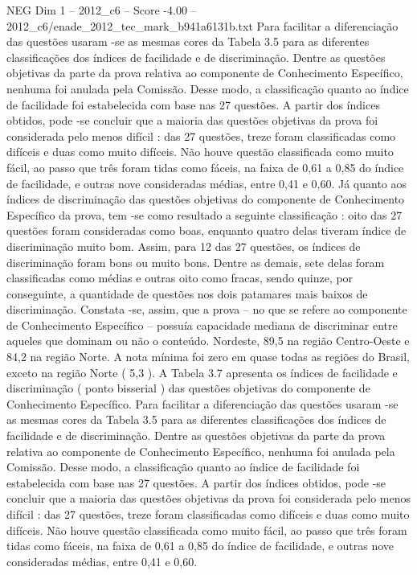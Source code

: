 \begin{textsample}{NEG Dim 1 – 2012\_c6 – Score -4.00 – 2012\_c6/enade\_2012\_tec\_mark\_b941a6131b.txt}
Para facilitar a diferenciação das questões usaram -se as mesmas cores da Tabela 3.5 para as diferentes classificações dos índices de facilidade e de discriminação.
Dentre as questões objetivas da parte da prova relativa ao componente de Conhecimento Específico, nenhuma foi anulada pela Comissão.
Desse modo, a classificação quanto ao índice de facilidade foi estabelecida com base nas 27 questões.
A partir dos índices obtidos, pode -se concluir que a maioria das questões objetivas da prova foi considerada pelo menos difícil : das 27 questões, treze foram classificadas como difíceis e duas como muito difíceis.
Não houve questão classificada como muito fácil, ao passo que três foram tidas como fáceis, na faixa de 0,61 a 0,85 do índice de facilidade, e outras nove consideradas médias, entre 0,41 e 0,60.
Já quanto aos índices de discriminação das questões objetivas do componente de Conhecimento Específico da prova, tem -se como resultado a seguinte classificação : oito das 27 questões foram consideradas como boas, enquanto quatro delas tiveram índice de discriminação muito bom.
Assim, para 12 das 27 questões, os índices de discriminação foram bons ou muito bons.
Dentre as demais, sete delas foram classificadas como médias e outras oito como fracas, sendo quinze, por conseguinte, a quantidade de questões nos dois patamares mais baixos de discriminação.
Constata -se, assim, que a prova – no que se refere ao componente de Conhecimento Específico – possuía capacidade mediana de discriminar entre aqueles que dominam ou não o conteúdo.
Nordeste, 89,5 na região Centro-Oeste e 84,2 na região Norte.
A nota mínima foi zero em quase todas as regiões do Brasil, exceto na região Norte ( 5,3 ).
A Tabela 3.7 apresenta os índices de facilidade e discriminação ( ponto bisserial ) das questões objetivas do componente de Conhecimento Específico.
Para facilitar a diferenciação das questões usaram -se as mesmas cores da Tabela 3.5 para as diferentes classificações dos índices de facilidade e de discriminação.
Dentre as questões objetivas da parte da prova relativa ao componente de Conhecimento Específico, nenhuma foi anulada pela Comissão.
Desse modo, a classificação quanto ao índice de facilidade foi estabelecida com base nas 27 questões.
A partir dos índices obtidos, pode -se concluir que a maioria das questões objetivas da prova foi considerada pelo menos difícil : das 27 questões, treze foram classificadas como difíceis e duas como muito difíceis.
Não houve questão classificada como muito fácil, ao passo que três foram tidas como fáceis, na faixa de 0,61 a 0,85 do índice de facilidade, e outras nove consideradas médias, entre 0,41 e 0,60.

\end{textsample}
